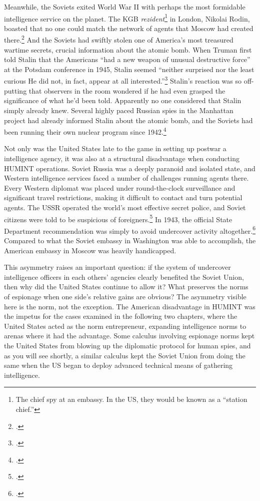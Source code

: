 \documentclass[11pt]{memoir}
\begin{document}
\begin{refsegment}
Meanwhile, the Soviets exited World War II with perhaps the most formidable intelligence service on the planet. The KGB \emph{rezident}\footnote{The chief spy at an embassy. In the US, they would be known as a ``station chief.''} in London, Nikolai Rodin, boasted that no one could match the network of agents that Moscow had created there.\footcite[p.~151]{haslam_near_2015} And the Soviets had swiftly stolen one of America's most treasured wartime secrets, crucial information about the atomic bomb. When Truman first told Stalin that the Americans ``had a new weapon of unusual destructive force'' at the Potsdam conference in 1945, Stalin seemed ``neither surprised nor the least curious \textelp{} He did not, in fact, appear at all interested.''\footcite[p.~443]{mccullough_truman_1992}  Stalin's reaction was so off-putting that observers in the room wondered if he had even grasped the significance of what he'd been told. Apparently no one considered that Stalin simply already knew. Several highly paced Russian spies in the Manhattan project had already informed Stalin about the atomic bomb, and the Soviets had been running their own nuclear program since 1942.\footcite[p.~443]{mccullough_truman_1992}

Not only was the United States late to the game in setting up postwar a intelligence agency, it was also at a structural disadvantage when conducting HUMINT operations. Soviet Russia was a deeply paranoid and isolated state, and Western intelligence services faced a number of challenges running agents there. Every Western diplomat was placed under round-the-clock surveillance and significant travel restrictions, making it difficult to contact and turn potential agents. The USSR operated the world's most effective secret police, and Soviet citizens were told to be suspicious of foreigners.\footcite[p.~42]{richelson_american_1987} In 1943, the official State Department recommendation was simply to avoid undercover activity altogether.\footcite[p.~44]{richelson_american_1987} Compared to what the Soviet embassy in Washington was able to accomplish, the American embassy in Moscow was heavily handicapped.

This asymmetry raises an important question: if the system of undercover intelligence officers in each others' agencies clearly benefited the Soviet Union, then why did the United States continue to allow it? What preserves the norms of espionage when one side's relative gains are obvious? The asymmetry visible here is the norm, not the exception. The American disadvantage in HUMINT was the impetus for the cases examined in the following two chapters, where the United States acted as the norm entrepreneur, expanding intelligence norms to arenas where it had the advantage. Some calculus involving espionage norms kept the United States from blowing up the diplomatic protocol for human spies, and as you will see shortly, a similar calculus kept the Soviet Union from doing the same when the US began to deploy advanced technical means of gathering intelligence.


\end{refsegment}
\end{document}
